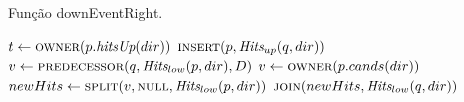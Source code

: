 \begin{algorithm}[H]
    \caption[Algoritmo \textsc{downEventRight} do par mais próximo cinético]{Função downEventRight.} \label{alg:par-cinetico:eventodowncaso2}
    \begin{algorithmic}[1]
            \State $t \leftarrow \Call{owner}{p.\hitsup(dir)}$ 
                \State {}
            \EndIf
            \State $\Call{insert}{p, \Hits_{up}(q, dir)}$
            \State $v \leftarrow \Call{predecessor}{q, \Hits_{low}(p, dir), D}$
                \State $v \leftarrow \Call{owner}{p.cands(dir)}$ 
            \EndIf
            \State $newHits \leftarrow \Call{split}{v, \nnull, \Hits_{low}(p,dir)}$ 
            \State $\Call{join}{newHits, \Hits_{low}(q, dir)}$
            \State {}
                \State {}
            \EndIf
        \EndFunction
    \end{algorithmic}
\end{algorithm}